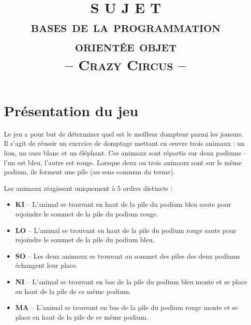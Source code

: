 \documentclass[10pt,a4paper,oneside]{article}
\begin{document}
\date{}
\author{}
\title{
    \vspace{-1.5cm}
    S U J E T\\
    {\Large \textsc{bases de la programmation orientée objet}}\\
    \vspace{3 mm}
    {\Large -- \textsc{Crazy Circus} --}\\
}

\maketitle

\vspace{-2.1cm}

\section{Présentation du jeu}

Le jeu a pour but de déterminer quel est le meilleur dompteur parmi les joueurs. Il s'agit de réussir un exercice de domptage mettant en \oe{}uvre trois animaux : un lion, un ours blanc et un éléphant. Ces animaux sont répartis sur deux podiums -- l'un est bleu, l'autre est rouge. Lorsque deux ou trois animaux sont sur le même podium, ils forment une pile (au sens commun du terme).

\medskip

Les animaux réagissent uniquement à 5 ordres distincts :

\medskip

\begin{itemize}
  \item \textbf{KI} -- L'animal se trouvant en haut de la pile du podium bleu saute pour rejoindre le sommet de la pile du podium rouge.
  \item \textbf{LO} -- L'animal se trouvant en haut de la pile du podium rouge saute pour rejoindre le sommet de la pile du podium bleu.
	\item \textbf{SO} -- Les deux animaux se trouvant au sommet des piles des deux podiums échangent leur place.  
  \item \textbf{NI} -- L'animal se trouvant en bas de la pile du podium bleu monte et se place en haut de la pile de ce même podium.
  \item \textbf{MA} -- L'animal se trouvant en bas de la pile du podium rouge monte et se place en haut de la pile de ce même podium.
\end{itemize}

\medskip
\end{document}
